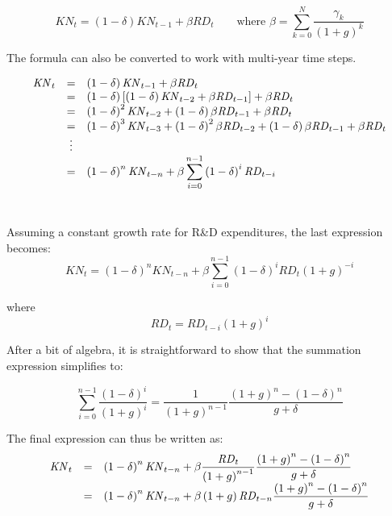 \documentclass[11pt,letterpaper]{report}
\begin{document}
\[
\mathit{KN}_{t} = \displaystyle \left(1-\delta \right) \mathit{KN}_{t-1}
+ \beta \mathit{RD}_{t} \qquad \textrm{where } \beta = \displaystyle \sum_{k=0}^N{ \frac{\gamma_{k}}{\left(1+g\right)^k} }
\]

\noindent The formula can also be converted to work with multi-year time steps.

\[
\begin{array}{l c l}
\mathit{KN}_{t}
& = & \displaystyle \left(1-\delta \right) \mathit{KN}_{t-1} + \beta \mathit{RD}_{t} \\
{} & = & \displaystyle \left(1-\delta \right) \left[\left(1-\delta \right) \mathit{KN}_{t-2} + \beta \mathit{RD}_{t-1} \right] + \beta \mathit{RD}_{t} \\
{} & = & \displaystyle \left(1-\delta \right)^2 \mathit{KN}_{t-2} + \left(1-\delta \right) \beta \mathit{RD}_{t-1} + \beta \mathit{RD}_{t} \\
{} & = & \displaystyle \left(1-\delta \right)^3 \mathit{KN}_{t-3} + \left(1-\delta \right)^2 \beta \mathit{RD}_{t-2} + \left(1-\delta \right) \beta \mathit{RD}_{t-1} + \beta \mathit{RD}_{t} \\
{} & \vdots & {} \\
{} & = & \displaystyle \left(1-\delta \right)^n \mathit{KN}_{t-n} + \beta \sum_{i=0}^{n-1}{\left(1-\delta \right)^i  \mathit{RD}_{t-i}} \\
\end{array}
\]\

\noindent Assuming a constant growth rate for R\&D expenditures, the last expression becomes:
\[
\mathit{KN}_{t} = \displaystyle \left(1-\delta \right)^n \mathit{KN}_{t-n} + \beta \sum_{i=0}^{n-1}{\left(1-\delta \right)^i  \mathit{RD}_{t} \left(1+g\right)^{-i}}
\]

\noindent where
\[
\mathit{RD}_{t} = \mathit{RD}_{t-i}  \left(1+g\right)^{i}
\]

\noindent After a bit of algebra, it is straightforward to show that the summation expression simplifies to:

\[
\sum_{i=0}^{n-1}{\frac{\left(1-\delta \right)^i} {\left(1+g\right)^{i}}} = \frac{1}{\left( 1 + g\right)^{n-1}}
\frac{\left(1+g\right)^n - \left(1-\delta\right)^n}{g + \delta}
\]

\noindent The final expression can thus be written as:
\[
\begin{array}{l c l}
\mathit{KN}_{t} & = & \displaystyle \left(1-\delta \right)^n \mathit{KN}_{t-n} + \beta \frac{\mathit{RD}_{t}}{\left( 1 + g\right)^{n-1}} \frac{\left(1+g\right)^n - \left(1-\delta\right)^n}{g + \delta} \\
& = & \displaystyle \left(1-\delta \right)^n \mathit{KN}_{t-n} + {\beta\left( 1 + g\right)\mathit{RD}_{t-n}} \frac{\left(1+g\right)^n - \left(1-\delta\right)^n}{g + \delta} \\
\end{array}
\]
\end{document}
